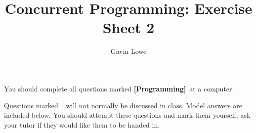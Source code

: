 \documentclass[fleqn,12pt]{article}
\title{Concurrent Programming: Exercise Sheet 2}
\author{Gavin Lowe}
\def\Programming{\textbf{[Programming]}}
\begin{document}
\maketitle


You should complete all questions marked \Programming\ at a computer.

Questions marked $\dagger$ will not normally be discussed in class.  Model
answers are included below.  You should attempt these questions and mark them
yourself; ask your tutor if they would like them to be handed in.


\end{document}
